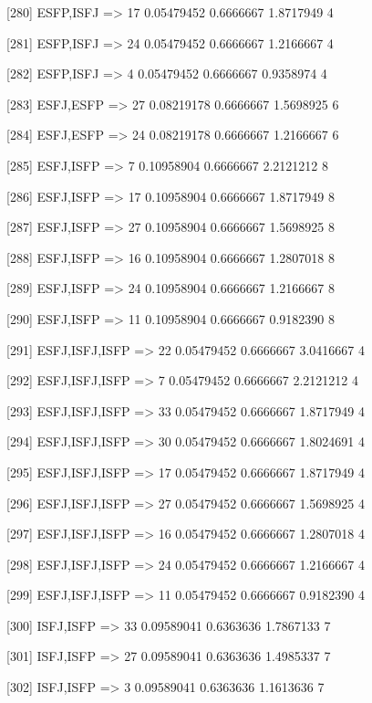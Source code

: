 [280] {ESFP,ISFJ}           => {17} 0.05479452 0.6666667  1.8717949  4   

[281] {ESFP,ISFJ}           => {24} 0.05479452 0.6666667  1.2166667  4   

[282] {ESFP,ISFJ}           => {4}  0.05479452 0.6666667  0.9358974  4   

[283] {ESFJ,ESFP}           => {27} 0.08219178 0.6666667  1.5698925  6   

[284] {ESFJ,ESFP}           => {24} 0.08219178 0.6666667  1.2166667  6   

[285] {ESFJ,ISFP}           => {7}  0.10958904 0.6666667  2.2121212  8   

[286] {ESFJ,ISFP}           => {17} 0.10958904 0.6666667  1.8717949  8   

[287] {ESFJ,ISFP}           => {27} 0.10958904 0.6666667  1.5698925  8   

[288] {ESFJ,ISFP}           => {16} 0.10958904 0.6666667  1.2807018  8   

[289] {ESFJ,ISFP}           => {24} 0.10958904 0.6666667  1.2166667  8   

[290] {ESFJ,ISFP}           => {11} 0.10958904 0.6666667  0.9182390  8   

[291] {ESFJ,ISFJ,ISFP}      => {22} 0.05479452 0.6666667  3.0416667  4   

[292] {ESFJ,ISFJ,ISFP}      => {7}  0.05479452 0.6666667  2.2121212  4   

[293] {ESFJ,ISFJ,ISFP}      => {33} 0.05479452 0.6666667  1.8717949  4   

[294] {ESFJ,ISFJ,ISFP}      => {30} 0.05479452 0.6666667  1.8024691  4   

[295] {ESFJ,ISFJ,ISFP}      => {17} 0.05479452 0.6666667  1.8717949  4   

[296] {ESFJ,ISFJ,ISFP}      => {27} 0.05479452 0.6666667  1.5698925  4   

[297] {ESFJ,ISFJ,ISFP}      => {16} 0.05479452 0.6666667  1.2807018  4   

[298] {ESFJ,ISFJ,ISFP}      => {24} 0.05479452 0.6666667  1.2166667  4   

[299] {ESFJ,ISFJ,ISFP}      => {11} 0.05479452 0.6666667  0.9182390  4   

[300] {ISFJ,ISFP}           => {33} 0.09589041 0.6363636  1.7867133  7   

[301] {ISFJ,ISFP}           => {27} 0.09589041 0.6363636  1.4985337  7   

[302] {ISFJ,ISFP}           => {3}  0.09589041 0.6363636  1.1613636  7   

